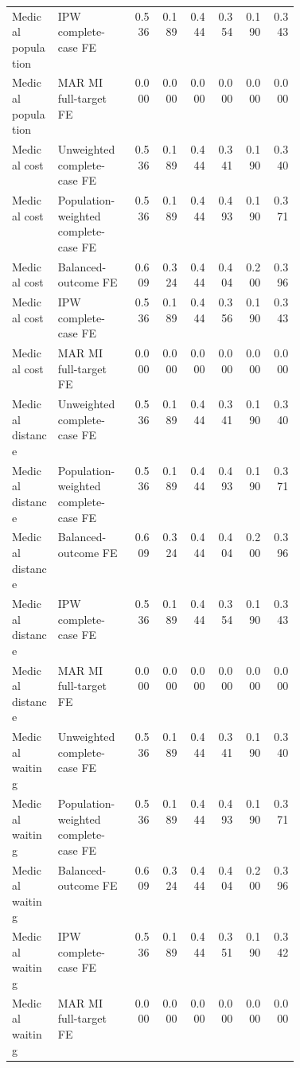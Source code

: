 \begin{tabular}{p{0.16\linewidth}p{0.26\linewidth}rrrrrr}
Medical population & IPW complete-case FE & 0.536 & 0.189 & 0.444 & 0.354 & 0.190 & 0.343 \\
Medical population & MAR MI full-target FE & 0.000 & 0.000 & 0.000 & 0.000 & 0.000 & 0.000 \\
Medical cost & Unweighted complete-case FE & 0.536 & 0.189 & 0.444 & 0.341 & 0.190 & 0.340 \\
Medical cost & Population-weighted complete-case FE & 0.536 & 0.189 & 0.444 & 0.493 & 0.190 & 0.371 \\
Medical cost & Balanced-outcome FE & 0.609 & 0.324 & 0.444 & 0.404 & 0.200 & 0.396 \\
Medical cost & IPW complete-case FE & 0.536 & 0.189 & 0.444 & 0.356 & 0.190 & 0.343 \\
Medical cost & MAR MI full-target FE & 0.000 & 0.000 & 0.000 & 0.000 & 0.000 & 0.000 \\
Medical distance & Unweighted complete-case FE & 0.536 & 0.189 & 0.444 & 0.341 & 0.190 & 0.340 \\
Medical distance & Population-weighted complete-case FE & 0.536 & 0.189 & 0.444 & 0.493 & 0.190 & 0.371 \\
Medical distance & Balanced-outcome FE & 0.609 & 0.324 & 0.444 & 0.404 & 0.200 & 0.396 \\
Medical distance & IPW complete-case FE & 0.536 & 0.189 & 0.444 & 0.354 & 0.190 & 0.343 \\
Medical distance & MAR MI full-target FE & 0.000 & 0.000 & 0.000 & 0.000 & 0.000 & 0.000 \\
Medical waiting & Unweighted complete-case FE & 0.536 & 0.189 & 0.444 & 0.341 & 0.190 & 0.340 \\
Medical waiting & Population-weighted complete-case FE & 0.536 & 0.189 & 0.444 & 0.493 & 0.190 & 0.371 \\
Medical waiting & Balanced-outcome FE & 0.609 & 0.324 & 0.444 & 0.404 & 0.200 & 0.396 \\
Medical waiting & IPW complete-case FE & 0.536 & 0.189 & 0.444 & 0.351 & 0.190 & 0.342 \\
Medical waiting & MAR MI full-target FE & 0.000 & 0.000 & 0.000 & 0.000 & 0.000 & 0.000 \\
\bottomrule
\end{tabular}
